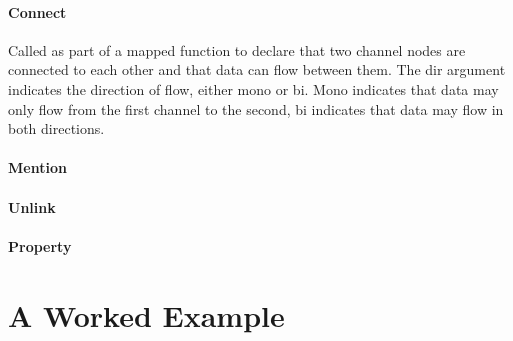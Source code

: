 \documentclass[12pt,twoside,openright,a4paper]{article}
\begin{document}
\paragraph{Connect}
Called as part of a mapped function to declare that two channel nodes are connected to each other and that data can flow between them. The dir argument indicates the direction of flow, either mono or bi. Mono indicates that data may only flow from the first channel to the second, bi indicates that data may flow in both directions. 

\paragraph{Mention}

\paragraph{Unlink}

\paragraph{Property}

\section{A Worked Example}
\end{document}

